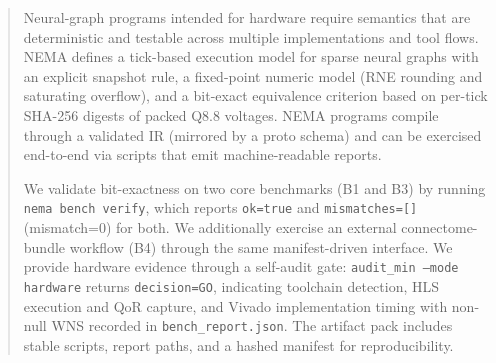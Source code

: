 \begin{abstract}
Neural-graph programs intended for hardware require semantics that are deterministic and testable across multiple implementations and tool flows. NEMA defines a tick-based execution model for sparse neural graphs with an explicit snapshot rule, a fixed-point numeric model (RNE rounding and saturating overflow), and a bit-exact equivalence criterion based on per-tick SHA-256 digests of packed Q8.8 voltages. NEMA programs compile through a validated IR (mirrored by a proto schema) and can be exercised end-to-end via scripts that emit machine-readable reports.

We validate bit-exactness on two core benchmarks (B1 and B3) by running \texttt{nema bench verify}, which reports \texttt{ok=true} and \texttt{mismatches=[]} (mismatch=0) for both. We additionally exercise an external connectome-bundle workflow (B4) through the same manifest-driven interface. We provide hardware evidence through a self-audit gate: \texttt{audit\_min --mode hardware} returns \texttt{decision=GO}, indicating toolchain detection, HLS execution and QoR capture, and Vivado implementation timing with non-null WNS recorded in \texttt{bench\_report.json}. The artifact pack includes stable scripts, report paths, and a hashed manifest for reproducibility.
\end{abstract}
